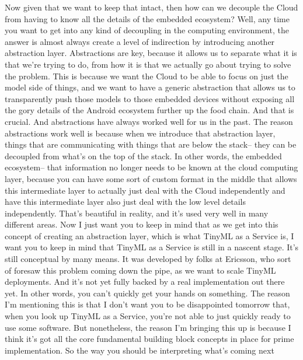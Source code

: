 {{{{{    Now given that we want to keep that intact,
    then how can we decouple the Cloud from having
    to know all the details of the embedded ecosystem?
    Well, any time you want to get into any kind of decoupling in the computing
    environment, the answer is almost always create a level of indirection
    by introducing another abstraction layer.
    Abstractions are key, because it allows us
    to separate what it is that we're trying to do,
    from how it is that we actually go about trying to solve the problem.
    This is because we want the Cloud to be able to focus on just the model
    side of things, and we want to have a generic abstraction that
    allows us to transparently push those models to those embedded devices
    without exposing all the gory details of the Android ecosystem
    further up the food chain.
    And that is crucial.
    And abstractions have always worked well for us in the past.
    The reason abstractions work well is because when
    we introduce that abstraction layer, things
    that are communicating with things that are below the stack--
    they can be decoupled from what's on the top of the stack.
    In other words, the embedded ecosystem--
    that information no longer needs to be known at the cloud computing layer,
    because you can have some sort of custom format in the middle that
    allows this intermediate layer to actually just deal with the Cloud
    independently and have this intermediate layer
    also just deal with the low level details independently.
    That's beautiful in reality, and it's used very well in many different areas.
    Now I just want you to keep in mind that as we
    get into this concept of creating an abstraction layer, which
    is what TinyML as a Service is, I want you
    to keep in mind that TinyML as a Service is still in a nascent stage.
    It's still conceptual by many means.
    It was developed by folks at Ericsson, who
    sort of foresaw this problem coming down the pipe,
    as we want to scale TinyML deployments.
    And it's not yet fully backed by a real implementation out there yet.
    In other words, you can't quickly get your hands on something.
    The reason I'm mentioning this is that I don't
    want you to be disappointed tomorrow that, when you look up
    TinyML as a Service, you're not able to just
    quickly ready to use some software.
    But nonetheless, the reason I'm bringing this up
    is because I think it's got all the core fundamental building block concepts
    in place for prime implementation.
    So the way you should be interpreting what's coming next
}}}}}
